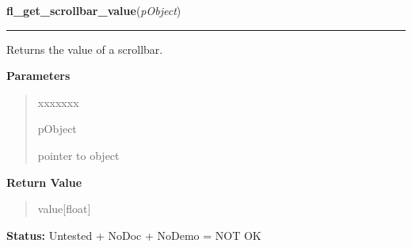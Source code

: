     \label{xformslib:library:fl_get_scrollbar_value}

    \vspace{0.5ex}

\hspace{.8\funcindent}\begin{boxedminipage}{\funcwidth}

    \raggedright \textbf{fl\_get\_scrollbar\_value}(\textit{pObject})

    \vspace{-1.5ex}

    \rule{\textwidth}{0.5\fboxrule}
\setlength{\parskip}{2ex}
    Returns the value of a scrollbar.

\setlength{\parskip}{1ex}
      \textbf{Parameters}
      \vspace{-1ex}

      \begin{quote}
        \begin{Ventry}{xxxxxxx}

          \item[pObject]

          pointer to object

        \end{Ventry}

      \end{quote}

      \textbf{Return Value}
    \vspace{-1ex}

      \begin{quote}
      value[float]

      \end{quote}

\textbf{Status:} Untested + NoDoc + NoDemo = NOT OK



    \end{boxedminipage}

    \label{xformslib:library:fl_set_scrollbar_value}

    \vspace{0.5ex}

